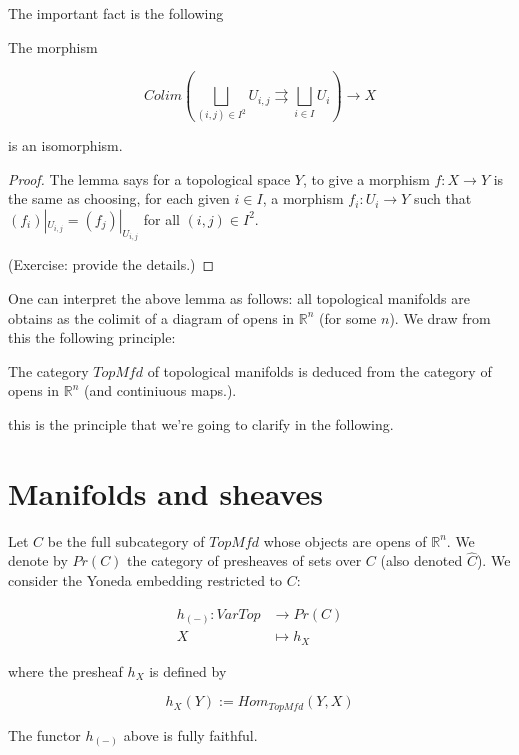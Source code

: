 \documentclass[../main.tex]{subfiles}
\begin{document}
The important fact is the following

\begin{lem}

The morphism

\[
Colim\left(\bigsqcup_{(i, j) \in I^2} U_{i, j} \rightrightarrows \bigsqcup_{i \in I} U_i\right) \to X
\]

is an isomorphism.
\end{lem}

\begin{proof}
The lemma says for a topological space $Y$, to give a morphism $f: X \to Y$ is the same as choosing, for each given $i \in I$, a morphism $f_i: U_i \to Y$ such that $(f_i)|_{U_{i, j}} = (f_j)|_{U_{i, j}}$ for all $(i, j) \in I^2$.

(Exercise: provide the details.)
\end{proof}

One can interpret the above lemma as follows: all topological manifolds are obtains as the colimit of a diagram of opens in $\mathbb R^n$ (for some $n$). We draw from this the following principle:

\begin{prcp*}
The category $TopMfd$ of topological manifolds is deduced from the category of opens in $\mathbb R^n$ (and continiuous maps.).
\end{prcp*}

this is the principle that we're going to clarify in the following.

\section{Manifolds and sheaves}

Let $C$ be the full subcategory of $TopMfd$ whose objects are opens of $\mathbb R^n$. We denote by $Pr(C)$ the category of presheaves of sets over $C$ (also denoted $\hat C$). We consider the Yoneda embedding restricted to $C$:

\begin{align}
h_{(-)}: VarTop &\to Pr(C)\\
X &\mapsto h_X
\end{align}

where the presheaf $h_X$ is defined by

\[
h_X(Y) := Hom_{TopMfd}(Y, X)
\]


\begin{lem}
    The functor $h_{(-)}$ above is fully faithful.
\end{lem}
\end{document}
